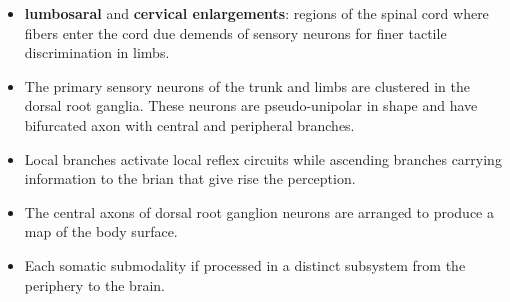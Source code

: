 \documentclass[12pt,a4paper]{article}
\begin{document}
\begin{itemize}
    \item \textbf{lumbosaral} and \textbf{cervical enlargements}: regions of the spinal cord where fibers enter the cord due demends of sensory neurons for finer tactile discrimination in limbs.
    \item The primary sensory neurons of the trunk and limbs are clustered in the dorsal root ganglia. These neurons are pseudo-unipolar in shape and have bifurcated axon with central and peripheral branches.
    \item Local branches activate local reflex circuits while ascending branches carrying information to the brian that give rise the perception.
    \item The central axons of dorsal root ganglion neurons are arranged to produce a map of the body surface.
    \item Each somatic submodality if processed in a distinct subsystem from the periphery to the brain.
\end{itemize}
\end{document}
